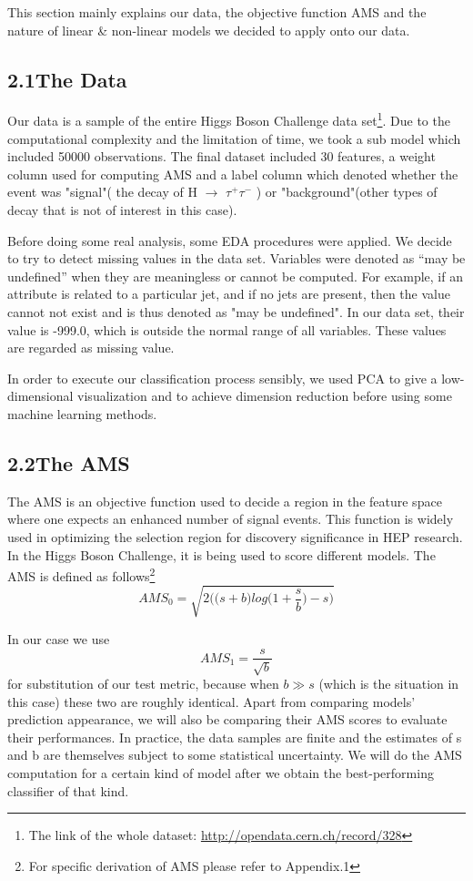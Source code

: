 \documentclass[11pt]{article}
\begin{document}
This section mainly explains our data, the objective function AMS and the nature of linear \& non-linear models we decided to apply onto our data.

\subsection*{2.1\quad The Data }
Our data is a sample of the entire Higgs Boson Challenge data set\footnote{The link of the whole dataset: \url{http://opendata.cern.ch/record/328} }. Due to the computational complexity and the limitation of time, we took a sub model which included 50000 observations. The final dataset included 30 features, a weight column used for computing AMS and a label column which denoted whether the event was "signal"( the decay of H $\rightarrow$ $\tau^{+}\tau^{-}$ ) or "background"(other types of decay that is not of interest in this case).

Before doing some real analysis, some EDA procedures were applied. We decide to try to detect missing values in the data set. Variables were denoted as “may be undefined” when they are meaningless or cannot be computed. For example, if an attribute is related to a particular jet, and if no jets are present, then the value cannot not exist and is thus denoted as "may be undefined".  In our data set, their value is -999.0, which is outside the normal range of all variables. These values are regarded as missing value.

In order to execute our classification process sensibly, we used PCA to give a low-dimensional visualization and to achieve dimension reduction before using some machine learning methods. 

\subsection*{2.2\quad The AMS}
The AMS is an objective function used to decide a region in the feature space where one expects an enhanced number of signal events. This function is widely used in optimizing the selection region for discovery significance in HEP research. In the Higgs Boson Challenge, it is being used to score different models. The AMS is defined as follows\footnote{
For specific derivation of AMS please refer to Appendix.1}  
$$AMS_{0}=\sqrt{2\bigg(\big(s+b\big)log\big(1+\frac{s}{b}\big)-s\bigg)}$$ 

In our case we use $$AMS_{1}=\frac{s}{\sqrt{b}}$$ for substitution of our test metric, because when $b\gg s$ (which is the situation in this case) these two are roughly identical. Apart from comparing models' prediction appearance, we will also be comparing their AMS scores to evaluate their performances. In practice, the data samples are finite and the estimates of s and b are themselves subject to some statistical uncertainty. We will do the AMS computation for a certain kind of model after we obtain the best-performing classifier of that kind.
\end{document}
